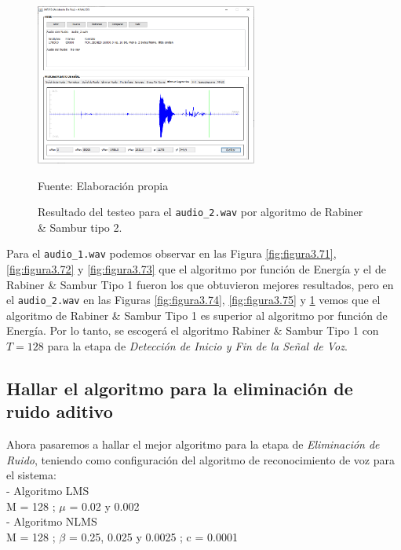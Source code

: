 \begin{figure}[H]
\begin{center}
\includegraphics[width=0.65\textwidth]{Imagenes/Cap3/image076}
\end{center}
\begin{center}
\vskip -0.5cm
\caption{\small{Resultado del testeo para el \texttt{audio\_2.wav} por algoritmo de Rabiner \& Sambur tipo 2.}}
\label{fig:figura3.76}
{\small{Fuente: Elaboración propia}}
\end{center}
\end{figure}

Para el \texttt{audio\_1.wav} podemos observar en las Figura \ref{fig:figura3.71}, \ref{fig:figura3.72} y \ref{fig:figura3.73} que el algoritmo por función de Energía y el de Rabiner \& Sambur Tipo 1 fueron los que obtuvieron mejores resultados, pero en el \texttt{audio\_2.wav} en las Figuras \ref{fig:figura3.74}, \ref{fig:figura3.75} y \ref{fig:figura3.76} vemos que el algoritmo de Rabiner \& Sambur Tipo 1 es superior al algoritmo por función de Energía. Por lo tanto, se escogerá el algoritmo Rabiner \& Sambur Tipo 1 con $T=128$ para la etapa de \textit{Detección de Inicio y Fin de la Señal de Voz}.

\subsection{Hallar el algoritmo para la eliminación de ruido aditivo}
Ahora pasaremos a hallar el mejor algoritmo para la etapa de \textit{Eliminación de Ruido}, teniendo como configuración del algoritmo de reconocimiento de voz para el sistema: \\
- Algoritmo LMS\\
\hspace*{1cm} M = 128 ; \qquad $\mu$ = 0.02 y 0.002\\
- Algoritmo NLMS \\
\hspace*{1cm} M = 128 ; \qquad $\beta$ = 0.25, 0.025 y 0.0025 ; \qquad c = 0.0001

